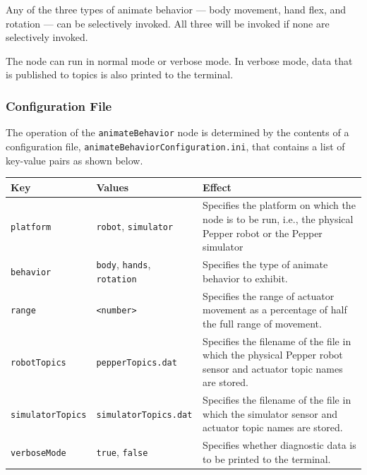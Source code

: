 \documentclass{CSSRforAfrica}
\begin{document}
Any of the three types of animate behavior --- body movement, hand flex, and rotation --- can be selectively invoked. All three will be invoked if none are selectively invoked.

The node can run in normal mode or verbose mode. In verbose mode, data that is published to topics is also printed to the terminal.

\subsubsection*{Configuration File}

The operation of the {\small \verb+animateBehavior+} node is determined by the contents of a configuration file, {\small \verb+animateBehaviorConfiguration.ini+}, that  contains a list of key-value pairs as shown below.  

\begin{center}
\begin{tabularx}{\linewidth}{| l | l | X|}
\hline 
{\small Key }                               & {\small Values }                                                 &  {\small Effect}       \\
\hline
{\footnotesize \verb+platform+ }  & {\footnotesize \verb+robot+, \verb+simulator+}     & {\small Specifies the platform on which the node is to be run, i.e., the physical Pepper robot or the Pepper simulator} \\ 
\hline
{\footnotesize \verb+behavior+ }  & {\footnotesize \verb+body+, \verb+hands+, \verb+rotation+}     & {\small Specifies the type of animate behavior to exhibit.} \\ 
\hline
{\footnotesize \verb+range+ }  & {\footnotesize \verb+<number>+}     & {\small Specifies the range of actuator movement as a percentage of half the full range of movement.} \\
\hline
{\footnotesize \verb+robotTopics+ }  & {\footnotesize \verb+pepperTopics.dat+}     & {\small Specifies the filename of the file in which the physical Pepper robot sensor and actuator topic names are stored.} \\
\hline
{\footnotesize \verb+simulatorTopics+}  & {\footnotesize \verb+simulatorTopics.dat+}     & {\small Specifies the filename of the file in which the simulator  sensor and actuator topic names are stored.} \\
\hline
{\footnotesize \verb+verboseMode+}  & {\footnotesize \verb+true+, \verb+false+}     & {\small Specifies whether diagnostic data is to be printed to the terminal.} \\
\hline
\end{tabularx}
\end{center}
\end{document}
